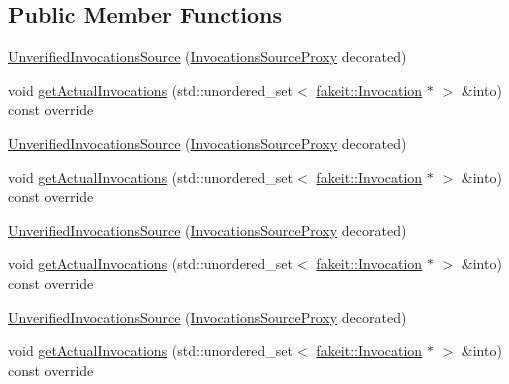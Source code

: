 \subsection*{Public Member Functions}
\begin{DoxyCompactItemize}
\item 
\mbox{\hyperlink{structfakeit_1_1UnverifiedInvocationsSource_a572c6af2dd898eee740fc9e412180d57}{Unverified\+Invocations\+Source}} (\mbox{\hyperlink{structfakeit_1_1InvocationsSourceProxy}{Invocations\+Source\+Proxy}} decorated)
\item 
void \mbox{\hyperlink{structfakeit_1_1UnverifiedInvocationsSource_a889468fefa500d0f7f524f8235a67b0c}{get\+Actual\+Invocations}} (std\+::unordered\+\_\+set$<$ \mbox{\hyperlink{structfakeit_1_1Invocation}{fakeit\+::\+Invocation}} $\ast$ $>$ \&into) const override
\item 
\mbox{\hyperlink{structfakeit_1_1UnverifiedInvocationsSource_a572c6af2dd898eee740fc9e412180d57}{Unverified\+Invocations\+Source}} (\mbox{\hyperlink{structfakeit_1_1InvocationsSourceProxy}{Invocations\+Source\+Proxy}} decorated)
\item 
void \mbox{\hyperlink{structfakeit_1_1UnverifiedInvocationsSource_a889468fefa500d0f7f524f8235a67b0c}{get\+Actual\+Invocations}} (std\+::unordered\+\_\+set$<$ \mbox{\hyperlink{structfakeit_1_1Invocation}{fakeit\+::\+Invocation}} $\ast$ $>$ \&into) const override
\item 
\mbox{\hyperlink{structfakeit_1_1UnverifiedInvocationsSource_a572c6af2dd898eee740fc9e412180d57}{Unverified\+Invocations\+Source}} (\mbox{\hyperlink{structfakeit_1_1InvocationsSourceProxy}{Invocations\+Source\+Proxy}} decorated)
\item 
void \mbox{\hyperlink{structfakeit_1_1UnverifiedInvocationsSource_a889468fefa500d0f7f524f8235a67b0c}{get\+Actual\+Invocations}} (std\+::unordered\+\_\+set$<$ \mbox{\hyperlink{structfakeit_1_1Invocation}{fakeit\+::\+Invocation}} $\ast$ $>$ \&into) const override
\item 
\mbox{\hyperlink{structfakeit_1_1UnverifiedInvocationsSource_a572c6af2dd898eee740fc9e412180d57}{Unverified\+Invocations\+Source}} (\mbox{\hyperlink{structfakeit_1_1InvocationsSourceProxy}{Invocations\+Source\+Proxy}} decorated)
\item 
void \mbox{\hyperlink{structfakeit_1_1UnverifiedInvocationsSource_a889468fefa500d0f7f524f8235a67b0c}{get\+Actual\+Invocations}} (std\+::unordered\+\_\+set$<$ \mbox{\hyperlink{structfakeit_1_1Invocation}{fakeit\+::\+Invocation}} $\ast$ $>$ \&into) const override

\end{DoxyCompactItemize}
